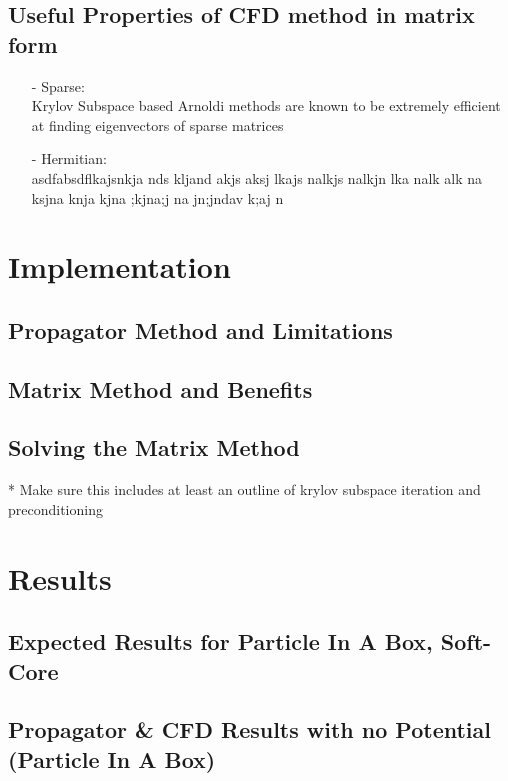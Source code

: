 \subsection{Useful Properties of CFD method in matrix form}
\begin{itemize}
\item[-]Sparse: \\ Krylov Subspace based Arnoldi methods are known to be extremely efficient at finding eigenvectors of sparse matrices
\item[-]Hermitian: \\ asdfabsdflkajsnkja nds kljand akjs aksj lkajs nalkjs nalkjn  lka nalk  alk na ksjna knja kjna ;kjna;j na jn;jndav k;aj n
\end{itemize}


\section{Implementation}

\subsection{Propagator Method and Limitations}

\subsection{Matrix Method and Benefits}

\subsection{Solving the Matrix Method}
* Make sure this includes at least an outline of krylov subspace iteration and preconditioning

\section{Results}

\subsection{Expected Results for Particle In A Box, Soft-Core}

\subsection{Propagator \& CFD Results with no Potential (Particle In A Box)}

